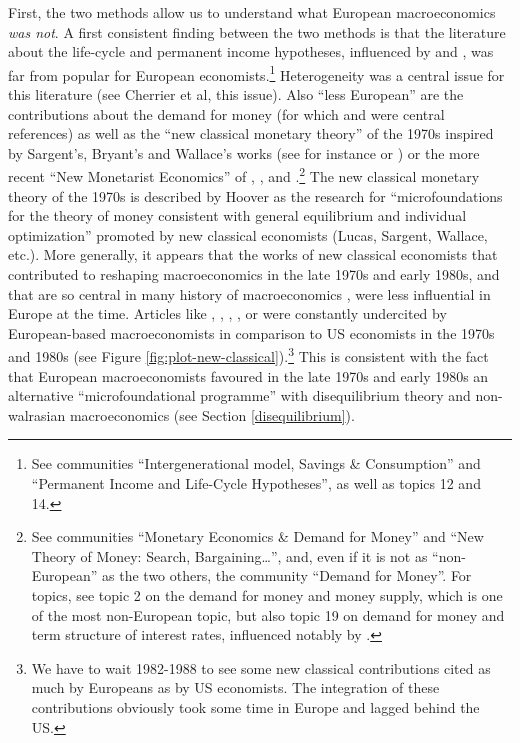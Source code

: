 \documentclass[]{elsarticle} %
\begin{document}
First, the two methods allow us to understand what European
macroeconomics \emph{was not}. A first consistent finding between the
two methods is that the literature about the life-cycle and permanent
income hypotheses, influenced by \citet{friedman1957} and
\citet{hall1978b}, was far from popular for European
economists.\footnote{See communities ``Intergenerational model, Savings
  \& Consumption'' and ``Permanent Income and Life-Cycle Hypotheses'',
  as well as topics 12 and 14.} Heterogeneity was a central issue for
this literature (see Cherrier et al, this issue). Also ``less European''
are the contributions about the demand for money (for which
\citet{baumol1952} and \citet{friedman1963} were central references) as
well as the ``new classical monetary theory'' \citep[chapter
6]{hoover1988} of the 1970s inspired by Sargent's, Bryant's and
Wallace's works (see for instance \citet{bryant1979} or
\citet{sargent1982}) or the more recent ``New Monetarist Economics'' of
\citet{kiyotaki1989}, \citet{kiyotaki1993}, and \citeauthor{trejos1995}
\citetext{\citeyear{trejos1995}; \citealp[see][chapter 2, for an
historical reconstruction of this literature]{frasser2020}}.\footnote{See
  communities ``Monetary Economics \& Demand for Money'' and ``New
  Theory of Money: Search, Bargaining\ldots{}'', and, even if it is not
  as ``non-European'' as the two others, the community ``Demand for
  Money''. For topics, see topic 2 on the demand for money and money
  supply, which is one of the most non-European topic, but also topic 19
  on demand for money and term structure of interest rates, influenced
  notably by \citet{fama1975}.} The new classical monetary theory of the
1970s is described by Hoover \citeyearpar[111]{hoover1988} as the
research for ``microfoundations for the theory of money consistent with
general equilibrium and individual optimization'' promoted by new
classical economists (Lucas, Sargent, Wallace, etc.). More generally, it
appears that the works of new classical economists that contributed to
reshaping macroeconomics in the late 1970s and early 1980s, and that are
so central in many history of macroeconomics \citep{devroey2016}, were
less influential in Europe at the time. Articles like \citet{lucas1972},
\citet{lucas1973}, \citet{barro1974}, \citet{sargent1975},
\citet{sargent1976} or \citet{barro1976} were constantly undercited by
European-based macroeconomists in comparison to US economists in the
1970s and 1980s (see Figure \ref{fig:plot-new-classical}).\footnote{We
  have to wait 1982-1988 to see some new classical contributions cited
  as much by Europeans as by US economists. The integration of these
  contributions obviously took some time in Europe and lagged behind the
  US.} This is consistent with the fact that European macroeconomists
favoured in the late 1970s and early 1980s an alternative
``microfoundational programme'' \citep{hoover2012} with disequilibrium
theory and non-walrasian macroeconomics (see Section
\ref{disequilibrium}).
\end{document}
